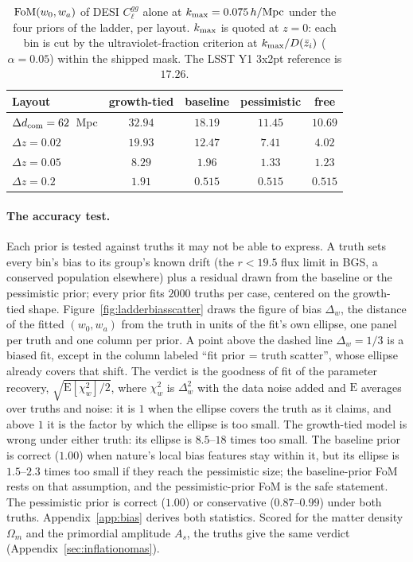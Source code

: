 \documentclass[11pt]{article}
\begin{document}
\begin{table}[ht]
  \centering
  \begin{tabular}{lcccc}
    \hline
    Layout & growth-tied & baseline & pessimistic & free \\
    \hline
    $\Delta d_{\rm com} = 62$~Mpc & $32.94$ & $18.19$ & $11.45$ & $10.69$ \\
    $\Delta z = 0.02$ & $19.93$ & $12.47$ & $7.41$ & $4.02$ \\
    $\Delta z = 0.05$ & $8.29$ & $1.96$ & $1.33$ & $1.23$ \\
    $\Delta z = 0.2$  & $1.91$ & $0.515$ & $0.515$ & $0.515$ \\
    \hline
  \end{tabular}
  \caption{${\rm FoM}(w_0, w_a)$ of DESI $C_\ell^{gg}$ alone at
    $k_{\rm max} = 0.075\,h/{\rm Mpc}$ under the four priors of the
    ladder, per layout.  $k_{\rm max}$ is quoted at $z = 0$: each bin
    is cut by the ultraviolet-fraction criterion at
    $k_{\rm max}/D(\bar{z}_i)$ ($\alpha = 0.05$) within the shipped
    mask.  The LSST Y1 3x2pt reference is $17.26$.}
  \label{tab:ladder}
\end{table}

\paragraph{The accuracy test.}
Each prior is tested against truths it may not be able to express.  A
truth sets every bin's bias to its group's known drift (the
$r < 19.5$ flux limit in BGS, a conserved population elsewhere) plus
a residual drawn from the baseline or the pessimistic prior; every
prior fits $2000$ truths per case, centered on the growth-tied
shape.  Figure~\ref{fig:ladderbiasscatter} draws the figure of
bias $\Delta_w$, the distance of the fitted $(w_0, w_a)$ from the
truth in units of the fit's own ellipse, one panel per truth and one
column per prior.  A point above the dashed line $\Delta_w = 1/3$ is a
biased fit, except in the column labeled ``fit prior = truth
scatter'', whose ellipse already covers that shift.  The verdict is
the goodness of fit of the parameter recovery,
$\sqrt{\mathrm{E}[\chi^2_w]/2}$, where
$\chi^2_w$ is $\Delta_w^2$ with the data noise added and
$\mathrm{E}$ averages over truths and noise: it is $1$ when the
ellipse covers the truth as it claims, and above $1$ it is the factor
by which the ellipse is too small.  The growth-tied model is wrong
under either truth: its ellipse is $8.5$--$18$ times too small.  The
baseline prior is correct ($1.00$) when nature's local bias features
stay within it, but its ellipse is $1.5$--$2.3$ times too small if
they reach the pessimistic size; the baseline-prior FoM rests on that
assumption, and the pessimistic-prior FoM is the safe statement.  The
pessimistic prior is correct ($1.00$) or conservative ($0.87$--$0.99$)
under both truths.  Appendix~\ref{app:bias} derives both statistics.
Scored for the matter density $\Omega_m$ and the primordial amplitude
$A_s$, the truths give the same verdict
(Appendix~\ref{sec:inflationomas}).
\end{document}
